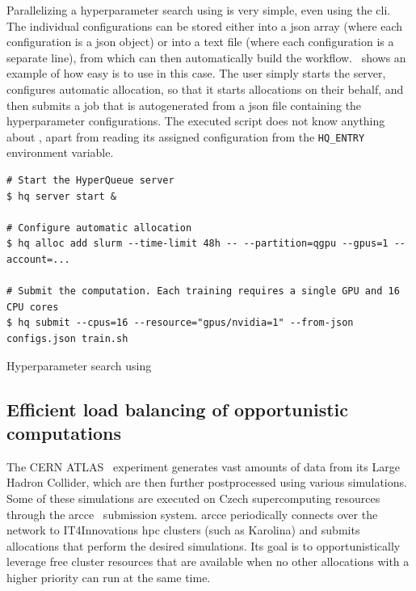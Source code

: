 Parallelizing a hyperparameter search using \hyperqueue{} is very simple, even using the
\gls{cli}. The individual configurations can be stored either into a
\gls{json} array (where each configuration is a \gls{json} object) or
into a text file (where each configuration is a separate line), from which \hq{}
can then automatically build the workflow.~ shows an example of how easy is
to use \hq{} in this case. The user simply starts the server, configures
automatic allocation, so that it starts allocations on their behalf, and then submits a job that is
autogenerated from a \gls{json} file containing the hyperparameter configurations. The
executed script does not know anything about \hyperqueue{}, apart from reading its
assigned configuration from the \texttt{HQ\_ENTRY} environment variable.

\begin{listing}[h]
	\begin{verbatim}
# Start the HyperQueue server
$ hq server start &

# Configure automatic allocation
$ hq alloc add slurm --time-limit 48h -- --partition=qgpu --gpus=1 --account=...

# Submit the computation. Each training requires a single GPU and 16 CPU cores
$ hq submit --cpus=16 --resource="gpus/nvidia=1" --from-json configs.json train.sh
	\end{verbatim}
	\caption{Hyperparameter search using \hyperqueue{}}
	\label{lst:hq-exa4mind-hyperparameter-search}
\end{listing}

\subsection{Efficient load balancing of opportunistic computations}
The CERN ATLAS~\cite{atlas} experiment generates vast amounts of data from its Large
Hadron Collider, which are then further postprocessed using various simulations. Some of these
simulations are executed on Czech supercomputing resources through the
\gls{arcce}~\cite{atlas-it4i-1} submission system. \gls{arcce}
periodically connects over the network to IT4Innovations \gls{hpc} clusters (such as
Karolina) and submits allocations that perform the desired simulations. Its goal is to
opportunistically leverage free cluster resources that are available when no other allocations with
a higher priority can run at the same time.

